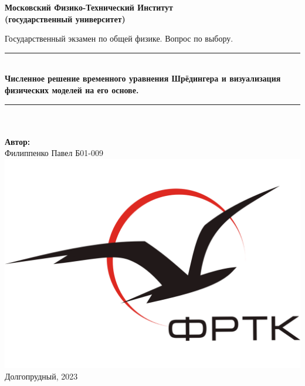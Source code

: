\newcommand{\HRule}{\rule{\linewidth}{0.7mm}} %
	
	\begin{center}
		\large\textbf{Московский Физико-Технический Институт}\\ %
		\large\textbf{(государственный университет)}
	
		\vfill
		
		\Large Государственный экзамен по общей физике. Вопрос по выбору.\\[0.5cm] %
		
		
		\HRule
		\\[0.4cm]
		{ \huge \bfseries Численное решение временного уравнения Шрёдингера и визуализация физических моделей на его основе.}%
		\\[0.4cm] 
		\HRule
		\\[0.5cm]
		
		\ \\
	\textbf{\large Автор:} \\	
	\large Филиппенко Павел Б01-009\\ %
		\vfill
		\hspace*{-0.8 cm}\includegraphics[width=100 pt]{../images/frkt_logo}\\ %
		\large Долгопрудный, 2023 %
	\end{center}

\newpage
\setcounter{page}{2}
\fancyfoot[c]{\thepage}
\fancyhead[L] {} %
\fancyhead[R]{}